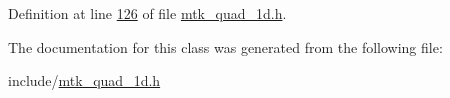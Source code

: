 Definition at line \hyperlink{mtk__quad__1d_8h_source_l00126}{126} of file \hyperlink{mtk__quad__1d_8h_source}{mtk\-\_\-quad\-\_\-1d.\-h}.



The documentation for this class was generated from the following file\-:\begin{DoxyCompactItemize}
\item 
include/\hyperlink{mtk__quad__1d_8h}{mtk\-\_\-quad\-\_\-1d.\-h}\end{DoxyCompactItemize}
